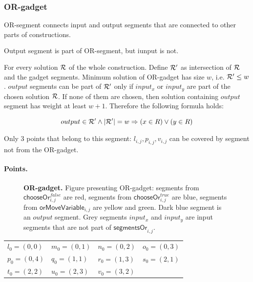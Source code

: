 \subsubsection{OR-gadget}

OR-segment connects input and output segments
that are connected to other parts of
constructions.

Output segment is part of OR-segment, but iunput is not.

For every solution $\mathcal{R}$ of the whole construction.
Define $\mathcal{R}'$ as intersection of $\mathcal{R}$ and the gadget segments.
Minimum solution of OR-gadget has size $w$, i.e. $\mathcal{R}' \le w$.
$output$ segments can be part of $\mathcal{R}'$ only 
if $input_x$ or $input_y$ are part of the chosen solution $\mathcal{R}$.
If none of them are chosen, then solution
containing $output$ segment has weight at least $w+1$.
Therefore the following formula holds:

$$output \in \mathcal{R}' \land |\mathcal{R}'| = w \Rightarrow (x \in R) \lor (y \in R) $$

Only 3 points that belong to this segment: $l_{i,j}, p_{i,j}, v_{i,j}$
can be covered by segment not from the OR-gadget.

\paragraph{Points.}

\newcommand{\chooseOr}[3]{\mathsf{chooseOr}^{#1}_{#2,#3}}
\newcommand{\orMoveVariable}[2]{\mathsf{orMoveVariable}_{#1,#2}}
\newcommand{\pointsOr}[2]{\mathsf{pointsOr}_{#1,#2}}
\newcommand{\segmentsOr}[2]{\mathsf{segmentsOr}_{#1,#2}}

\begin{figure}[h]
\centering
\def\svgwidth{0.5\columnwidth}

\caption{
	\textbf{OR-gadget.} Figure presenting OR-gadget:
	segments from $\chooseOr{false}{i}{j}$ are red,
	segments from $\chooseOr{true}{i}{j}$ are blue,
	segments from $\orMoveVariable{i}{j}$ are yellow and green.
	Dark blue segment is an $output$ segment.
	Grey segments $input_x$ and $input_y$ are input segments that
	are not part of $\segmentsOr{i}{j}$.
}
\label{fig:apx_or_gadget}
\end{figure}

\begin{center}
	\begin{tabular}{ l l l l}

		$l_0 = (0, 0)$ &
		$m_0 = (0, 1)$ &
		$n_0 = (0, 2)$ &
		$o_0 = (0, 3)$ \\
		$p_0 = (0, 4)$ &
		$q_0 = (1, 1)$ &
		$r_0 = (1, 3)$ &
		$s_0 = (2, 1)$ \\
		$t_0 = (2, 2)$ &
		$u_0 = (2, 3)$ &
		$v_0 = (3, 2)$ &
	\end{tabular}
\end{center}


